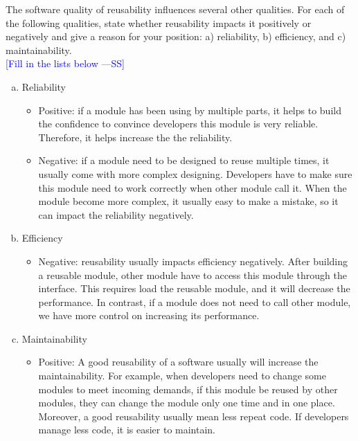 \documentclass[12pt,fleqn]{examtst}
\newcommand{\authornote}[3]{\textcolor{#1}{[#3 ---#2]}}
\newcommand{\authornote}[3]{}
\newcommand{\wss}[1]{\authornote{blue}{SS}{#1}}
\begin{document}
\newpage


The software quality of reusability influences several other qualities.  For
each of the following qualities, state whether reusability impacts it positively
or negatively and give a reason for your position: a) reliability, b)
efficiency, and c) maintainability.\\

\noindent \wss{Fill in the lists below}

\begin{enumerate}[a)]
\item Reliability
\begin{itemize}
\item Positive: if a module has been using by multiple parts, it helps to build the confidence to convince developers this 
module is very reliable. Therefore, it helps increase the the reliability.
\item Negative: if a module need to be designed to reuse multiple times, it usually come with more complex designing. Developers 
have to make sure this module need to work correctly when other module call it. When the module become more complex, it usually 
easy to make a mistake, so it can impact the reliability negatively.
\end{itemize}
\item Efficiency
\begin{itemize}
\item Negative: reusability usually impacts efficiency negatively. After building a reusable module, other module have to access 
this module through the interface. This requires load the reusable module, and it will decrease the performance. In contrast, 
if a module does not need to call other module, we have more control on increasing its performance.
\end{itemize}
\item Maintainability
\begin{itemize}
\item Positive: A good reusability of a software usually will increase the maintainability. For example, when developers need 
to change some modules to meet incoming demands, if this module be reused by other modules, they can change the module only 
one time and in one place. Moreover, a good reusability usually mean less repeat code. If developers manage less code, it 
is easier to maintain.
\end{itemize}
\end{enumerate}
\end{document}
